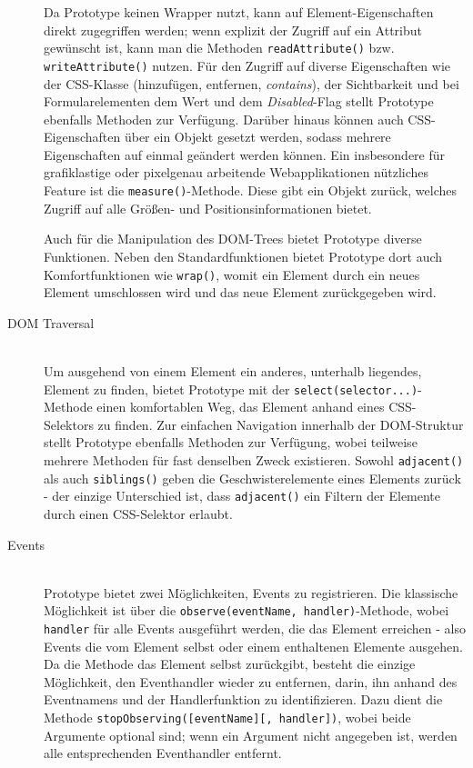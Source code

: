 \begin{description}
Da Prototype keinen Wrapper nutzt, kann auf Element-Eigenschaften direkt zugegriffen werden; wenn
explizit der Zugriff auf ein Attribut gewünscht ist, kann man die Methoden
\lstinline{readAttribute()} bzw. \lstinline{writeAttribute()} nutzen. Für den Zugriff auf diverse
Eigenschaften wie der CSS-Klasse (hinzufügen, entfernen, \emph{contains}), der Sichtbarkeit und bei
Formularelementen dem Wert und dem \emph{Disabled}-Flag  stellt Prototype ebenfalls Methoden zur
Verfügung. Darüber hinaus können auch CSS-Eigenschaften über ein Objekt gesetzt werden, sodass
mehrere Eigenschaften auf einmal geändert werden können. Ein insbesondere für grafiklastige oder
pixelgenau arbeitende Webapplikationen nützliches Feature ist die \lstinline{measure()}-Methode.
Diese gibt ein Objekt zurück, welches Zugriff auf alle Größen- und Positionsinformationen bietet.

Auch für die Manipulation des DOM-Trees bietet Prototype diverse Funktionen. Neben den
Standardfunktionen bietet Prototype dort auch Komfortfunktionen wie \lstinline{wrap()}, womit ein
Element durch ein neues Element umschlossen wird und das neue Element zurückgegeben wird.

\item[DOM Traversal] \hfill \\
Um ausgehend von einem Element ein anderes, unterhalb liegendes, Element zu finden, bietet Prototype
mit der \lstinline{select(selector...)}-Methode einen komfortablen Weg, das Element anhand eines
CSS-Selektors zu finden. Zur einfachen Navigation innerhalb der DOM-Struktur stellt Prototype
ebenfalls Methoden zur Verfügung, wobei teilweise mehrere Methoden für fast denselben Zweck
existieren. Sowohl \lstinline{adjacent()} als auch \lstinline{siblings()} geben die
Geschwisterelemente eines Elements zurück - der einzige Unterschied ist, dass \lstinline{adjacent()}
ein Filtern der Elemente durch einen CSS-Selektor erlaubt.

\item[Events] \hfill \\
Prototype bietet zwei Möglichkeiten, Events zu registrieren. Die klassische Möglichkeit ist über die
\lstinline{observe(eventName, handler)}-Methode, wobei \lstinline{handler} für alle Events
ausgeführt werden, die das Element erreichen - also Events die vom Element selbst oder einem
enthaltenen Elemente ausgehen. Da die Methode das Element selbst zurückgibt, besteht die einzige
Möglichkeit, den Eventhandler wieder zu entfernen, darin, ihn anhand des Eventnamens und der
Handlerfunktion zu identifizieren. Dazu dient die Methode
\lstinline{stopObserving([eventName][, handler])}, wobei beide Argumente optional sind; wenn
ein Argument nicht angegeben ist, werden alle entsprechenden Eventhandler entfernt.


\end{description}
